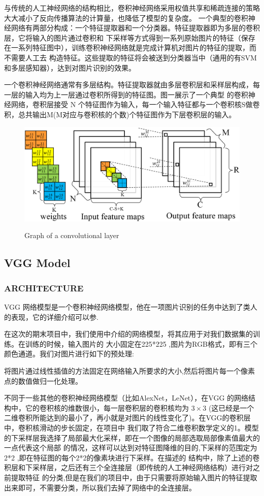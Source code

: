\documentclass[10pt,a4paper]{ctexart}
\begin{document}
    与传统的人工神经网络的结构相比，卷积神经网络采用权值共享和稀疏连接的策略大大减小了反向传播算法的计算量，也降低了模型的复杂度。
一个典型的卷积神经网络有两部分构成：一个特征提取器和一个分类器。特征提取器即为多层的卷积层，它将输入的图片通过卷积和
下采样等方式得到一系列原始图片的特征（保存在一系列特征图中），训练卷积神经网络就是完成计算机对图片的特征的提取，而不需要人工去
构造特征。这些提取的特征将会被送到分类器当中（通用的有SVM和多层感知器），达到对图片识别的效果。
	
一个卷积神经网络通常有多层结构。特征提取器就由多层卷积层和采样层构成，每一层的输入均为上一层通过卷积所得到的特征图。图一展示了一个典型
的卷积神经网络，卷积层接受 N 个特征图作为输入，每一个输入特征都与一个卷积核S做卷积，总共输出M(M对应与卷积核的个数)个特征图作为下层卷积层的输入。
	\begin{figure}[h]
		\centering
		{\includegraphics[width=0.8\linewidth]{convolve.png}}
		\caption{Graph of a convolutional layer}
	\end{figure}
	\subsection{VGG Model}
	\subsubsection{ARCHITECTURE}
    VGG 网络模型是一个卷积神经网络模型，他在一项图片识别的任务中达到了类人的表现，它的详细介绍可以参\cite{Simonyan2014Very}.
	
    在这次的期末项目中，我们使用\cite{Simonyan2014Very}中介绍的网络模型，将其应用于对我们数据集的训练。在训练的时候，输入图片的
    大小固定在225*225 ,图片为RGB格式，即有三个颜色通道。我们对图片进行如下的预处理:
    
    将图片通过线性插值的方法固定在网络输入所要求的大小,然后将图片每一个像素点的数值做归一化处理。
	
    不同于一些其他的卷积神经网络模型（比如AlexNet，LeNet），在VGG 的网络结构中，它的卷积核的维数很小，每一层卷积层的卷积核均为
    $3\times3$ (这已经是一个二维卷积所能达到的最小了，再小就是对图片的线性变化了)。在VGG的卷积层中，卷积核滑动的步长固定，在项目中
    我们取了符合二维卷积数学定义的1。模型的下采样层我选择了局部最大化采样，即在一个图像的局部选取局部像素值最大的一点代表这个局部
    的情况，这样可以达到对特征图降维的目的,下采样的范围定为2*2 ,即在特征图的每个2*2的像素块进行下采样。在\cite{Simonyan2014Very}描述的
    结构中，除了上述的卷积层和下采样层，之后还有三个全连接层（即传统的人工神经网络结构）进行对之前提取特征
    的分类,但是在我们的项目中，由于只需要将原始输入图片的特征提取出来即可，不需要分类，所以我们去掉了网络中的全连接层。
	
\end{document}
